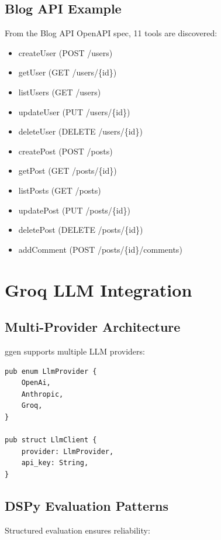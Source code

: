 \subsection{Blog API Example}

From the Blog API OpenAPI spec, 11 tools are discovered:

\begin{itemize}
    \item createUser (POST /users)
    \item getUser (GET /users/\{id\})
    \item listUsers (GET /users)
    \item updateUser (PUT /users/\{id\})
    \item deleteUser (DELETE /users/\{id\})
    \item createPost (POST /posts)
    \item getPost (GET /posts/\{id\})
    \item listPosts (GET /posts)
    \item updatePost (PUT /posts/\{id\})
    \item deletePost (DELETE /posts/\{id\})
    \item addComment (POST /posts/\{id\}/comments)
\end{itemize}

\section{Groq LLM Integration}

\subsection{Multi-Provider Architecture}

ggen supports multiple LLM providers:

\begin{verbatim}
pub enum LlmProvider {
    OpenAi,
    Anthropic,
    Groq,
}

pub struct LlmClient {
    provider: LlmProvider,
    api_key: String,
}
\end{verbatim}

\subsection{DSPy Evaluation Patterns}

Structured evaluation ensures reliability:

